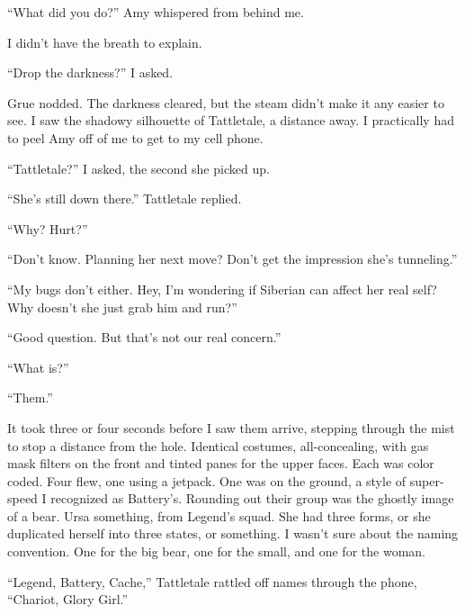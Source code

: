 ``What did you do?''  Amy whispered from behind me.



I didn't have the breath to explain.



``Drop the darkness?''  I asked.



Grue nodded.  The darkness cleared, but the steam didn't make it any easier to see.  I saw the shadowy silhouette of Tattletale, a distance away.  I practically had to peel Amy off of me to get to my cell phone.



``Tattletale?'' I asked, the second she picked up.



``She's still down there.''  Tattletale replied.



``Why?  Hurt?''



``Don't know.  Planning her next move?  Don't get the impression she's tunneling.''



``My bugs don't either.  Hey, I'm wondering if Siberian can affect her real self?  Why doesn't she just grab him and run?''



``Good question.  But that's not our real concern.''



``What is?''



``Them.''



It took three or four seconds before I saw them arrive, stepping through the mist to stop a distance from the hole.  Identical costumes, all-concealing, with gas mask filters on the front and tinted panes for the upper faces.  Each was color coded.  Four flew, one using a jetpack.  One was on the ground, a style of super-speed I recognized as Battery's.  Rounding out their group was the ghostly image of a bear.  Ursa something, from Legend's squad.  She had three forms, or she duplicated herself into three states, or something.  I wasn't sure about the naming convention.  One for the big bear, one for the small, and one for the woman.



``Legend, Battery, Cache,'' Tattletale rattled off names through the phone, ``Chariot, Glory Girl.''




